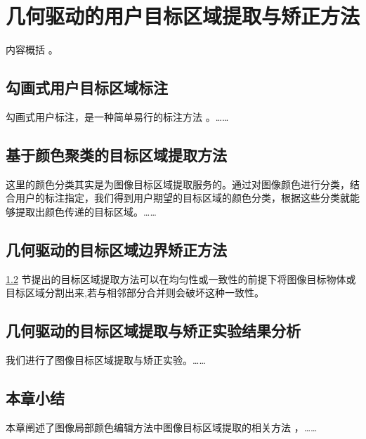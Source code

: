 \chapter{几何驱动的用户目标区域提取与矫正方法}
内容概括 \cite{zhang98}。

\section{勾画式用户目标区域标注}
勾画式用户标注，是一种简单易行的标注方法\cite{hariharan14,Li08,Su81,Liu93,jiang99} 。……

\section{基于颜色聚类的目标区域提取方法}
\label{sec1}
这里的颜色分类其实是为图像目标区域提取服务的。通过对图像颜色进行分类，结合用户的标注指定，我们得到用户期望的目标区域的颜色分类，根据这些分类就能够提取出颜色传递的目标区域。……

\section{几何驱动的目标区域边界矫正方法}
\ref{sec1} 节提出的目标区域提取方法可以在均匀性或一致性的前提下将图像目标物体或目标区域分割出来,若与相邻部分合并则会破坏这种一致性。

\section{几何驱动的目标区域提取与矫正实验结果分析}
我们进行了图像目标区域提取与矫正实验。……

\section{本章小结}
本章阐述了图像局部颜色编辑方法中图像目标区域提取的相关方法 ，……
